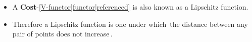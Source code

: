 
\begin{itemize}
    \item A \textbf{Cost}-\ref{V-functor|functor|referenced} is also known as a Lipschitz function.
    \item Therefore a Lipschitz function is one under which \,the distance between any pair of points does not increase\,.
  \end{itemize}

